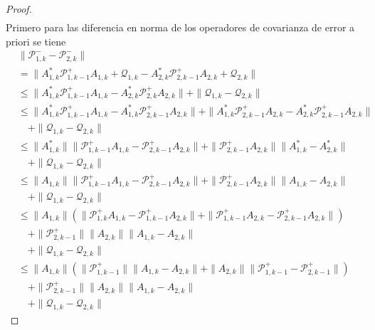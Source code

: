 \begin{proof}
\begin{equation*}
\begin{aligned}
		\end{aligned}
	\end{equation*}
	Primero para las diferencia en norma de los operadores de covarianza de error a priori se tiene
	\begin{equation*}
		\begin{aligned}
			 & \| \mathcal{P}_{1,k}^- - \mathcal{P}_{2,k}^-\| \\
			 & = \| A_{1,k}^* \mathcal{P}_{1,k-1}^+ A_{1,k} + \mathcal{Q}_{1,k} -A_{2,k}^* \mathcal{P}_{2,k-1}^+ A_{2,k} + \mathcal{Q}_{2,k}  \| \\
			 & \leq \|A_{1,k}^* \mathcal{P}_{1,k-1}^+ A_{1,k} - A_{2,k}^* \mathcal{P}_{2,k}^+ A_{2,k} \| + \| \mathcal{Q}_{1,k} - \mathcal{Q}_{2,k}  \| \\
			 & \leq \|A_{1,k}^* \mathcal{P}_{1,k-1}^+ A_{1,k} - A_{1,k}^* \mathcal{P}_{2,k-1}^+ A_{2,k} \| +  \|A_{1,k}^* \mathcal{P}_{2,k-1}^+ A_{2,k} - A_{2,k}^* \mathcal{P}_{2,k-1}^+ A_{2,k} \| \\ 
			 & \quad + \| \mathcal{Q}_{1,k} - \mathcal{Q}_{2,k}  \| \\
			 & \leq \|A_{1,k}^* \| \| \mathcal{P}_{1,k-1}^+ A_{1,k} - \mathcal{P}_{2,k-1}^+ A_{2,k} \| + \| \mathcal{P}_{2,k-1}^+ A_{2,k}  \| \|A_{1,k}^* - A_{2,k}^* \| \\ 
			 & \quad + \| \mathcal{Q}_{1,k} - \mathcal{Q}_{2,k}  \| \\
			 & \leq \|A_{1,k} \| \| \mathcal{P}_{1,k-1}^+ A_{1,k} - \mathcal{P}_{2,k-1}^+ A_{2,k} \| + \| \mathcal{P}_{2,k-1}^+ A_{2,k}  \| \|A_{1,k} - A_{2,k} \| \\ 
			 & \quad + \| \mathcal{Q}_{1,k} - \mathcal{Q}_{2,k}  \| \\
			 & \leq \|A_{1,k} \| (\| \mathcal{P}_{1,k}^+ A_{1,k} - \mathcal{P}_{1,k-1}^+ A_{2,k} \| + \| \mathcal{P}_{1,k-1}^+ A_{2,k} - \mathcal{P}_{2,k-1}^+ A_{2,k} \| ) \\
			 & \quad + \| \mathcal{P}_{2,k-1}^+ \| \| A_{2,k}  \| \|A_{1,k} - A_{2,k} \| \\ 
			 & \quad + \| \mathcal{Q}_{1,k} - \mathcal{Q}_{2,k}  \| \\
			 & \leq \|A_{1,k} \| ( \| \mathcal{P}_{1,k-1}^+ \| \|  A_{1,k} - A_{2,k} \| + \| A_{2,k} \| \| \mathcal{P}_{1,k-1}^+  - \mathcal{P}_{2,k-1}^+  \| ) \\
			 & \quad + \| \mathcal{P}_{2,k-1}^+ \| \| A_{2,k}  \| \|A_{1,k} - A_{2,k} \| \\ 
			 & \quad + \| \mathcal{Q}_{1,k} - \mathcal{Q}_{2,k}  \|
		\end{aligned}
	\end{equation*}

\end{proof}
